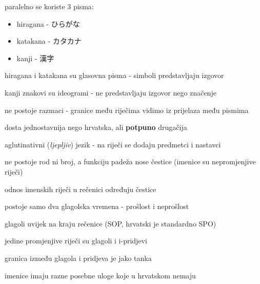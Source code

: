 	\begin{hyou}
		\item paralelno se koriste 3 pisma:
		\begin{itemize}
			\itemsep-5pt
			\item hiragana - ひらがな
			\item katakana - カタカナ
			\item kanji - 漢字
		\end{itemize}
		\item hiragana i katakana su glasovna pisma - simboli predstavljaju izgovor
		\item kanji znakovi su ideogrami - ne predstavljaju izgovor nego značenje
		\item ne postoje razmaci - granice među riječima vidimo iz prijelaza među pismima
	\end{hyou}

	\fukudai{Gramatika}
	\begin{hyou}
		\item dosta jednostavnija nego hrvatska, ali \textbf{potpuno} drugačija
		\item aglutinativni (\textit{ljepljiv}) jezik - na riječi se dodaju predmetci i nastavci
		\item ne postoje rod ni broj, a funkciju padeža nose čestice (imenice su nepromjenjive riječi)
		\item odnos imenskih riječi u rečenici određuju čestice
		\item postoje samo dva glagolska vremena - prošlost i neprošlost
		\item glagoli uvijek na kraju rečenice (SOP, hrvatski je standardno SPO)
		\item jedine promjenjive riječi su glagoli i i-pridjevi
		\item granica između glagola i pridjeva je jako tanka
		\item imenice imaju razne posebne uloge koje u hrvatskom nemaju
	\end{hyou}

